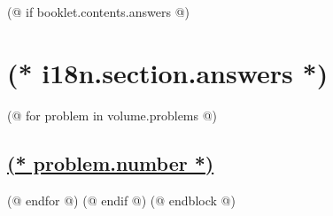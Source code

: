     (@ if booklet.contents.answers @)
        \section{(* i18n.section.answers *)}
        \pagestyle{answers}
        (@ for problem in volume.problems @)%
            \setcounter{problem}{(* problem.number *)}%
            \hypersetup{linkcolor=black}%
            \subsection{%
                \texorpdfstring{%
                    \hyperref[ssc:(* problem.id *)-solution]{(* problem.number *)}%
                }{%
                    (* problem.number *). (* problem.id *)%
                }%
            }%
            \label{ssc:(* problem.id*)-answer}%
            \hypersetup{linkcolor=colour-link}%
        (@ endfor @)
    (@ endif @)
(@ endblock @)
